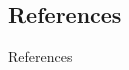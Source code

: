 \documentclass{beamer}
\begin{document}

\subsection*{References}

\begin{frame}[allowframebreaks]{References}
\printbibliography
\end{frame}
\end{document}
